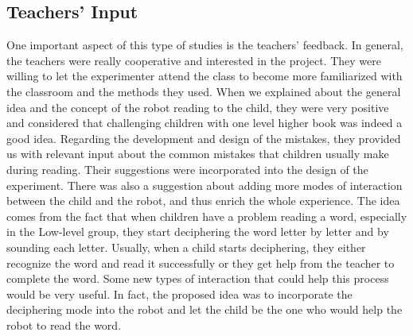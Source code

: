\documentclass{sigchi}
\begin{document}
\subsection{Teachers' Input}
One important aspect of this type of studies is the teachers' feedback. 
In general, the teachers were really cooperative and interested in the project. 
They were willing to let the experimenter attend the class to become more familiarized with the classroom and the methods they used.
When we explained about the general idea and the concept of the robot reading to the child, they were very positive and considered that challenging children with one level higher book was indeed a good idea.
Regarding the development and design of the mistakes, they provided us with relevant input about the common mistakes that children usually make during reading.
Their suggestions were incorporated into the design of the experiment.
There was also a suggestion about adding more modes of interaction between the child and the robot, and thus enrich the whole experience. 
The idea comes from the fact that when children have a problem reading a word, especially in the Low-level group, they start deciphering the word letter by letter and by sounding each letter.
Usually, when a child starts deciphering, they either recognize the word and read it successfully or they get help from the teacher to complete the word. 
Some new types of interaction that could help this process would be very useful. 
In fact, the proposed idea was to incorporate the deciphering mode into the robot and let the child be the one who would help the robot to read the word. 
\end{document}
